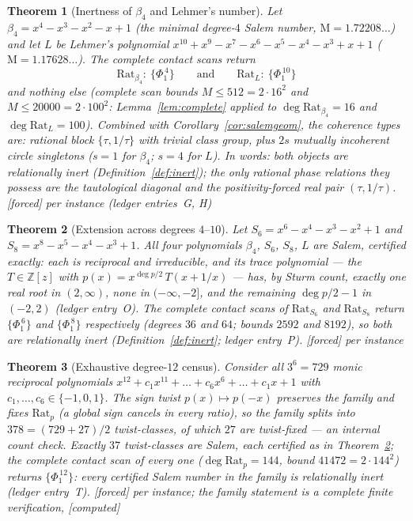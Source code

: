 \documentclass[11pt]{article}
\theoremstyle{plain}
\newtheorem{theorem}{Theorem}[section]
\theoremstyle{definition}
\theoremstyle{remark}
\newcommand{\Z}{\mathbb{Z}}
\newcommand{\Mah}{\mathrm{M}}
\newcommand{\Rat}{\mathrm{Rat}}
\newcommand{\F}{\textnormal{[forced]}}
\newcommand{\C}{\textnormal{[computed]}}
\begin{document}
\begin{theorem}[Inertness of $\beta_4$ and Lehmer's number]\label{thm:inert}
Let $\beta_4=x^4-x^3-x^2-x+1$ (the minimal degree-$4$ Salem number,
$\Mah=1.72208\ldots$) and let $L$ be Lehmer's polynomial
$x^{10}+x^9-x^7-x^6-x^5-x^4-x^3+x+1$ ($\Mah=1.17628\ldots$). The complete
contact scans return
\[
\Rat_{\beta_4}:\ \{\Phi_1^{\,4}\}\qquad\text{and}\qquad
\Rat_{L}:\ \{\Phi_1^{\,10}\}
\]
and nothing else (complete scan bounds $M\le512=2\cdot16^2$ and
$M\le20000=2\cdot100^2$: Lemma~\ref{lem:complete} applied to
$\deg\Rat_{\beta_4}=16$ and $\deg\Rat_L=100$). Combined
with Corollary~\ref{cor:salemgeom}, the coherence types are: rational block
$\{\tau,1/\tau\}$ with trivial class group, plus $2s$ mutually incoherent
circle singletons ($s=1$ for $\beta_4$; $s=4$ for $L$). In words: \emph{both
objects are relationally inert (Definition~\ref{def:inert}); the only rational
phase relations they possess are the tautological diagonal and the
positivity-forced real pair $(\tau,1/\tau)$.}
\F{} per instance (ledger entries~G, H)
\end{theorem}

\begin{theorem}[Extension across degrees $4$--$10$]\label{thm:inertmore}
Let $S_6=x^6-x^4-x^3-x^2+1$ and $S_8=x^8-x^5-x^4-x^3+1$. All four polynomials
$\beta_4$, $S_6$, $S_8$, $L$ are Salem, certified exactly: each is reciprocal
and irreducible, and its trace polynomial --- the $T\in\Z[z]$ with
$p(x)=x^{\deg p/2}\,T(x+1/x)$ --- has, by Sturm count, exactly one real root
in $(2,\infty)$, none in $(-\infty,-2]$, and the remaining $\deg p/2-1$ in
$(-2,2)$ (ledger entry~O). The complete contact scans of $\Rat_{S_6}$ and
$\Rat_{S_8}$ return $\{\Phi_1^{\,6}\}$ and $\{\Phi_1^{\,8}\}$ respectively
(degrees $36$ and $64$; bounds $2592$ and $8192$), so both are relationally
inert (Definition~\ref{def:inert}; ledger entry~P). \F{} per instance
\end{theorem}

\begin{theorem}[Exhaustive degree-$12$ census]\label{thm:census}
Consider all $3^6=729$ monic reciprocal polynomials
$x^{12}+c_1x^{11}+\dots+c_6x^6+\dots+c_1x+1$ with
$c_1,\dots,c_6\in\{-1,0,1\}$. The sign twist $p(x)\mapsto p(-x)$ preserves
the family and fixes $\Rat_p$ (a global sign cancels in every ratio), so the
family splits into $378=(729+27)/2$ twist-classes, of which $27$ are
twist-fixed --- an internal count check. Exactly $37$ twist-classes are
Salem, each certified as in Theorem~\ref{thm:inertmore}; the complete
contact scan of every one ($\deg\Rat_p=144$, bound $41472=2\cdot144^2$)
returns $\{\Phi_1^{\,12}\}$: \emph{every certified Salem number in the
family is relationally inert} (ledger entry~T). \F{} per instance; the
family statement is a complete finite verification, \C
\end{theorem}
\end{document}
